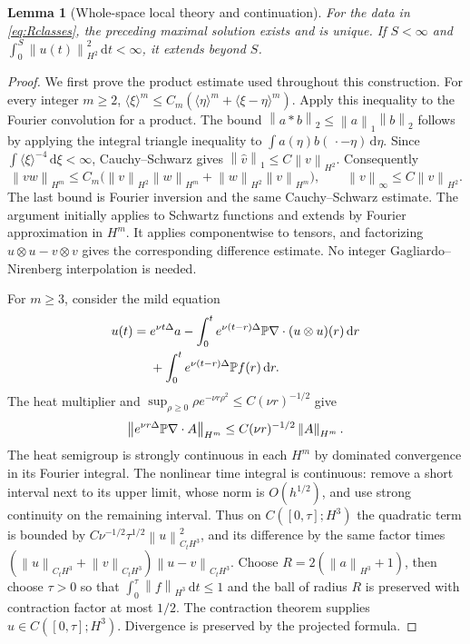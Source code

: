 \documentclass[11pt,a4paper]{article}
\newtheorem{lemma}[theorem]{Lemma}
\theoremstyle{definition}\newtheorem{definition}[theorem]{Definition}
\theoremstyle{remark}\newtheorem{remark}[theorem]{Remark}
\newcommand{\dd}{\,\mathrm d}\newcommand{\eps}{\varepsilon}
\newcommand{\norm}[1]{\left\lVert#1\right\rVert}
\begin{document}
\begin{lemma}[Whole-space local theory and continuation]\label{lem:Rlocal}
For the data in \eqref{eq:Rclasses}, the preceding maximal solution exists and is unique. If $S<\infty$ and
$\int_0^S\norm{u(t)}_{H^2}^2\dd t<\infty$, it extends beyond $S$.
\end{lemma}
\begin{proof}
We first prove the product estimate used throughout this construction. For every integer $m\ge2$,
$\langle\xi\rangle^m\le C_m(\langle\eta\rangle^m+\langle\xi-\eta\rangle^m)$.
Apply this inequality to the Fourier convolution for a product. The bound
$\norm{a*b}_2\le\norm{a}_1\norm{b}_2$ follows by applying the integral triangle inequality to $\int a(\eta)b(\,\cdot-\eta)\dd\eta$. Since $\int\langle\xi\rangle^{-4}\dd\xi<\infty$, Cauchy--Schwarz gives
$\norm{\widehat v}_1\le C\norm{v}_{H^2}$. Consequently
\begin{equation}\label{eq:Rproduct}
 \norm{vw}_{H^m}
 \le C_m\bigl(\norm{v}_{H^2}\norm{w}_{H^m}
              +\norm{w}_{H^2}\norm{v}_{H^m}\bigr),\qquad
 \norm{v}_{\infty}\le C\norm{v}_{H^2}.
\end{equation}
The last bound is Fourier inversion and the same Cauchy--Schwarz estimate. The argument initially applies to Schwartz functions and extends by Fourier approximation in $H^m$. It applies componentwise to tensors, and factorizing $u\otimes u-v\otimes v$ gives the corresponding difference estimate. No integer Gagliardo--Nirenberg interpolation is needed.

For $m\ge3$, consider the mild equation
\begin{align}
 u(t)={}&e^{\nu t\Delta}a
 -\int_0^t e^{\nu(t-r)\Delta}\PP\nabla\cdot(u\otimes u)(r)\dd r\nonumber\\
 &+\int_0^t e^{\nu(t-r)\Delta}\PP f(r)\dd r.\label{eq:mild}
\end{align}
The heat multiplier and $\sup_{\rho\ge0}\rho e^{-\nu r\rho^2}\le C(\nu r)^{-1/2}$ give
\[
 \norm{e^{\nu r\Delta}\PP\nabla\cdot A}_{H^m}
 \le C(\nu r)^{-1/2}\norm{A}_{H^m}.
\]
The heat semigroup is strongly continuous in each $H^m$ by dominated
convergence in its Fourier integral. The nonlinear time integral is
continuous: remove a short interval next to its upper limit, whose norm is
$O(h^{1/2})$, and use strong continuity on the remaining interval.
Thus on $C([0,\tau];H^3)$ the quadratic term is bounded by
$C\nu^{-1/2}\tau^{1/2}\norm{u}_{C_tH^3}^2$, and its difference by the same factor times
$(\norm{u}_{C_tH^3}+\norm{v}_{C_tH^3})\norm{u-v}_{C_tH^3}$.
Choose $R=2(\norm{a}_{H^3}+1)$, then choose $\tau>0$ so that $\int_0^\tau\norm{f}_{H^3}\dd t\le1$ and the ball of radius $R$ is preserved with contraction factor at most $1/2$. The contraction theorem supplies $u\in C([0,\tau];H^3)$. Divergence is preserved by the projected formula.


\end{proof}
\end{document}
